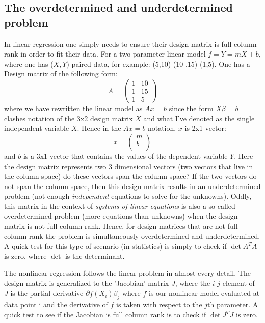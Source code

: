  \subsection{The overdetermined and underdetermined problem}\label{overdeter}
In linear regression one simply needs to ensure their design matrix is full column rank in order to fit their data.  For a two parameter linear model $f = Y=mX +b$, where one has ($X,Y$) paired data, for example: (5,10) (10 ,15) (1,5).  One has a Design matrix of the following form:
\[ A =
\begin{pmatrix}
1 & 10 \\
1&15\\
1&5
\end{pmatrix}
\]
where we have rewritten the linear model as $Ax=b$ since the form $X\beta=b$ clashes notation of the 3x2 design matrix $X$ and what I've denoted as the single independent variable $X$.  Hence in the $Ax=b$ notation, $x$ is 2x1 vector:
\begin{equation}
x=\begin{pmatrix}
m \\
b\\
\end{pmatrix}
\end{equation}
and $b$ is a 3x1 vector that contains the values of the dependent variable $Y$.
Here the design matrix represents two 3 dimensional vectors (two vectors that live in the column space) do these vectors span the column space?  If the two vectors do not span the column space, then this design matrix results in an underdetermined problem (not enough \emph{independent} equations to solve for the unknowns).  Oddly, this matrix in the context of \emph{systems of linear equations} is also a so-called overdetermined problem (more equations than unknowns) when the design matrix is not full column rank.  Hence, for design matrices that are not full column rank the problem is simultaneously overdetermined and underdetermined.  A quick test for this type of scenario (in statistics) is simply to check if $\det{A^TA}$ is zero, where $\det$ is the determinant.

The nonlinear regression follows the linear problem in almost every detail.  The design matrix is generalized to the 'Jacobian' matrix $J$, where the $i$ $j$ element of $J$ is the partial derivative $\partial{f(X_i)}{\beta_j}$ where $f$ is our nonlinear model evaluated at data point i and the derivative of $f$ is taken with respect to the $j$th parameter.  A quick test to see if the Jacobian is full column rank is to check if $\det{J^TJ}$ is zero.

